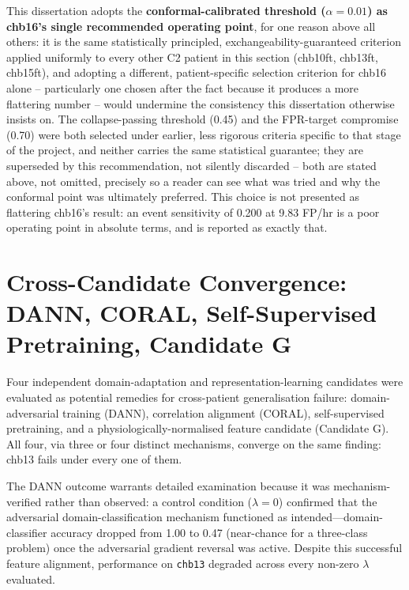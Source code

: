 This dissertation adopts the \textbf{conformal-calibrated threshold ($\alpha=0.01$) as chb16's single recommended operating point}, for one reason above all others: it is the same statistically principled, exchangeability-guaranteed criterion applied uniformly to every other C2 patient in this section (chb10ft, chb13ft, chb15ft), and adopting a different, patient-specific selection criterion for chb16 alone -- particularly one chosen after the fact because it produces a more flattering number -- would undermine the consistency this dissertation otherwise insists on. The collapse-passing threshold (0.45) and the FPR-target compromise (0.70) were both selected under earlier, less rigorous criteria specific to that stage of the project, and neither carries the same statistical guarantee; they are superseded by this recommendation, not silently discarded -- both are stated above, not omitted, precisely so a reader can see what was tried and why the conformal point was ultimately preferred. This choice is not presented as flattering chb16's result: an event sensitivity of 0.200 at 9.83 FP/hr is a poor operating point in absolute terms, and is reported as exactly that.

\section{Cross-Candidate Convergence: DANN, CORAL, Self-Supervised Pretraining, Candidate G}
\label{sec:results-convergence}

Four independent domain-adaptation and representation-learning candidates were evaluated as potential remedies for cross-patient generalisation failure: domain-adversarial training (DANN), correlation alignment (CORAL), self-supervised pretraining, and a physiologically-normalised feature candidate (Candidate G). All four, via three or four distinct mechanisms, converge on the same finding: chb13 fails under every one of them.


The DANN outcome warrants detailed examination because it was mechanism-verified rather than observed: a control condition ($\lambda=0$) confirmed that the adversarial domain-classification mechanism functioned as intended---domain-classifier accuracy dropped from 1.00 to 0.47 (near-chance for a three-class problem) once the adversarial gradient reversal was active. Despite this successful feature alignment, performance on \texttt{chb13} degraded across every non-zero $\lambda$ evaluated. 


